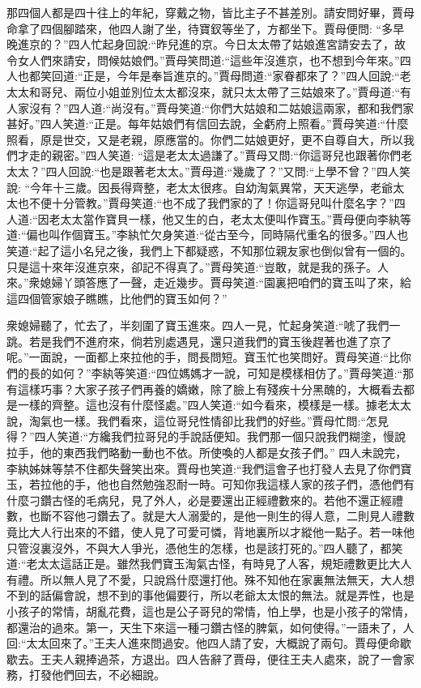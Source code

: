 \begin{parag}
    那四個人都是四十往上的年紀，穿戴之物，皆比主子不甚差別。請安問好畢，賈母命拿了四個腳踏來，他四人謝了坐，待寶釵等坐了，方都坐下。賈母便問: “多早晚進京的？”四人忙起身回說:“昨兒進的京。今日太太帶了姑娘進宮請安去了，故令女人們來請安，問候姑娘們。”賈母笑問道:“這些年沒進京，也不想到今年來。”四人也都笑回道:“正是，今年是奉旨進京的。”賈母問道:“家眷都來了？”四人回說:“老太太和哥兒、兩位小姐並別位太太都沒來，就只太太帶了三姑娘來了。”賈母道:“有人家沒有？”四人道:“尚沒有。”賈母笑道:“你們大姑娘和二姑娘這兩家，都和我們家甚好。”四人笑道:“正是。每年姑娘們有信回去說，全虧府上照看。”賈母笑道:“什麼照看，原是世交，又是老親，原應當的。你們二姑娘更好，更不自尊自大，所以我們才走的親密。”四人笑道: “這是老太太過謙了。”賈母又問:“你這哥兒也跟著你們老太太？”四人回說:“也是跟著老太太。”賈母道:“幾歲了？”又問:“上學不曾？”四人笑說: “今年十三歲。因長得齊整，老太太很疼。自幼淘氣異常，天天逃學，老爺太太也不便十分管教。”賈母笑道:“也不成了我們家的了！你這哥兒叫什麼名字？”四人道:“因老太太當作寶貝一樣，他又生的白，老太太便叫作寶玉。”賈母便向李紈等道:“偏也叫作個寶玉。”李紈忙欠身笑道:“從古至今，同時隔代重名的很多。”四人也笑道:“起了這小名兒之後，我們上下都疑惑，不知那位親友家也倒似曾有一個的。只是這十來年沒進京來，卻記不得真了。”賈母笑道:“豈敢，就是我的孫子。人來。”衆媳婦丫頭答應了一聲，走近幾步。賈母笑道:“園裏把咱們的寶玉叫了來，給這四個管家娘子瞧瞧，比他們的寶玉如何？”
\end{parag}


\begin{parag}
    衆媳婦聽了，忙去了，半刻圍了寶玉進來。四人一見，忙起身笑道:“唬了我們一跳。若是我們不進府來，倘若別處遇見，還只道我們的寶玉後趕著也進了京了呢。”一面說，一面都上來拉他的手，問長問短。寶玉忙也笑問好。賈母笑道:“比你們的長的如何？”李紈等笑道:“四位媽媽才一說，可知是模樣相仿了。”賈母笑道:“那有這樣巧事？大家子孩子們再養的嬌嫩，除了臉上有殘疾十分黑醜的，大概看去都是一樣的齊整。這也沒有什麼怪處。”四人笑道:“如今看來，模樣是一樣。據老太太說，淘氣也一樣。我們看來，這位哥兒性情卻比我們的好些。”賈母忙問:“怎見得？”四人笑道:“方纔我們拉哥兒的手說話便知。我們那一個只說我們糊塗，慢說拉手，他的東西我們略動一動也不依。所使喚的人都是女孩子們。” 四人未說完，李紈姊妹等禁不住都失聲笑出來。賈母也笑道:“我們這會子也打發人去見了你們寶玉，若拉他的手，他也自然勉強忍耐一時。可知你我這樣人家的孩子們，憑他們有什麼刁鑽古怪的毛病兒，見了外人，必是要還出正經禮數來的。若他不還正經禮數，也斷不容他刁鑽去了。就是大人溺愛的，是他一則生的得人意，二則見人禮數竟比大人行出來的不錯，使人見了可愛可憐，背地裏所以才縱他一點子。若一味他只管沒裏沒外，不與大人爭光，憑他生的怎樣，也是該打死的。”四人聽了，都笑道:“老太太這話正是。雖然我們寶玉淘氣古怪，有時見了人客，規矩禮數更比大人有禮。所以無人見了不愛，只說爲什麼還打他。殊不知他在家裏無法無天，大人想不到的話偏會說，想不到的事他偏要行，所以老爺太太恨的無法。就是弄性，也是小孩子的常情，胡亂花費，這也是公子哥兒的常情，怕上學，也是小孩子的常情，都還治的過來。第一，天生下來這一種刁鑽古怪的脾氣，如何使得。”一語未了，人回:“太太回來了。”王夫人進來問過安。他四人請了安，大概說了兩句。賈母便命歇歇去。王夫人親捧過茶，方退出。四人告辭了賈母，便往王夫人處來，說了一會家務，打發他們回去，不必細說。
\end{parag}


